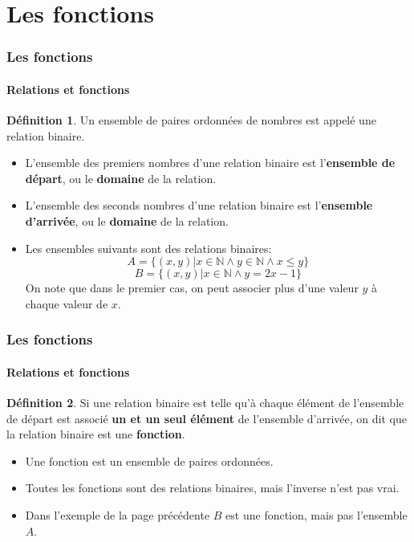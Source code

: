 \documentclass[10pt,notheorems]{beamer}
\theoremstyle{plain}
\theoremstyle{definition} %
\newtheorem{definition}{Définition}
\begin{document}
\section{Les fonctions}

\begin{frame}
  \frametitle{Les fonctions}
  \framesubtitle{Relations et fonctions}
  \hypertarget{slide_relations_et_fonctions_1}{}

  \begin{definition}\label{def:relation} Un ensemble de paires ordonnées de nombres est appelé une relation binaire.
  \end{definition}

  \begin{itemize}
  \item L'ensemble des premiers nombres d'une relation binaire est l'\textbf{ensemble de départ}, ou le \textbf{domaine} de la relation.\newline
  \item L'ensemble des seconds nombres d'une relation binaire est l'\textbf{ensemble d'arrivée}, ou le \textbf{domaine} de la relation.\newline
  \item Les ensembles suivants sont des relations binaires:
    \[
      A = \{(x,y)| x\in\mathbb N \land y\in\mathbb N \land x\leq y\}
    \]
    \[
      B = \{(x,y)| x\in\mathbb N \land y = 2x-1\}
    \]
    On note que dans le premier cas, on peut associer plus d'une valeur $y$ à chaque valeur de $x$.
  \end{itemize}

\end{frame}


\begin{frame}
  \frametitle{Les fonctions}
  \framesubtitle{Relations et fonctions}
  \hypertarget{slide_relations_et_fonctions_2}{}

  \begin{definition}\label{def:fonction} Si une relation binaire est telle qu'à chaque élément de l'ensemble de départ est associé \textbf{un et un seul élément} de l'ensemble d'arrivée, on dit que la relation binaire est une \textbf{fonction}.
  \end{definition}

  \bigskip

  \begin{itemize}
  \item Une fonction est un ensemble de paires ordonnées.\newline
  \item Toutes les fonctions sont des relations binaires, mais l'inverse n'est pas vrai.\newline
  \item Dans l'exemple de la page précédente $B$ est une fonction, mais pas l'ensemble $A$.
  \end{itemize}

\end{frame}
\end{document}
